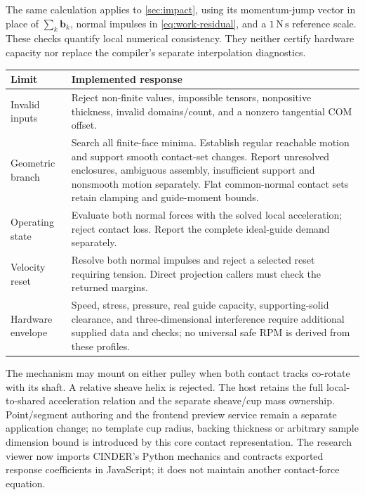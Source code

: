 \documentclass[11pt,letterpaper]{article}
\numberwithin{equation}{section}
\begin{document}
The same calculation applies to \cref{sec:impact}, using its momentum-jump
vector in place of $\sum_k\bm b_k$, normal impulses in
\cref{eq:work-residual}, and a $1\,\mathrm{N\,s}$ reference scale.
These checks quantify local numerical consistency. They neither certify
hardware capacity nor replace the compiler's separate interpolation diagnostics.

\begin{center}\begin{tabularx}{\textwidth}{@{}p{}Y@{}}
\toprule
Limit & Implemented response\\\midrule
Invalid inputs & Reject non-finite values, impossible tensors, nonpositive thickness,
invalid domains/count, and a nonzero tangential COM offset.\\[.4em]
Geometric branch & Search all finite-face minima. Establish regular reachable
motion and support smooth contact-set changes. Report unresolved enclosures,
ambiguous assembly, insufficient support and nonsmooth motion separately. Flat common-normal contact
sets retain clamping and guide-moment bounds.\\[.4em]
Operating state & Evaluate both normal forces with the solved local acceleration;
reject contact loss. Report the complete ideal-guide demand separately.\\[.4em]
Velocity reset & Resolve both normal impulses and reject a selected reset requiring
tension. Direct projection callers must check the returned margins.\\[.4em]
Hardware envelope & Speed, stress, pressure, real guide capacity, supporting-solid
clearance, and three-dimensional interference require additional supplied data
and checks; no universal safe RPM is derived from these profiles.\\\bottomrule
\end{tabularx}\end{center}

The mechanism may mount on either pulley when both contact tracks co-rotate
with its shaft. A relative sheave helix is rejected. The host retains the full
local-to-shared acceleration relation and the separate sheave/cup mass
ownership. Point/segment authoring and the frontend preview service remain a separate
application change; no template cup radius, backing thickness or arbitrary
sample dimension bound is introduced by this core contact representation. The research viewer now imports CINDER's Python
mechanics and contracts exported response coefficients in JavaScript; it does
not maintain another contact-force equation.
\end{document}
